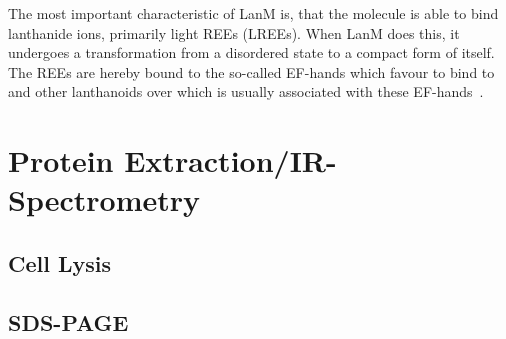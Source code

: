 The most important characteristic of LanM is, that the molecule is able to bind lanthanide ions, primarily light REEs (LREEs).
When LanM does this, it undergoes a transformation from a disordered state to a compact form of itself.
The REEs are hereby bound to the so-called EF-hands which favour to bind to  and other lanthanoids over  which is usually associated with these EF-hands~\cite{lanmstructure}.


\section{Protein Extraction/IR-Spectrometry\authorB{}}

\subsection{Cell Lysis}

\subsection{SDS-PAGE}
